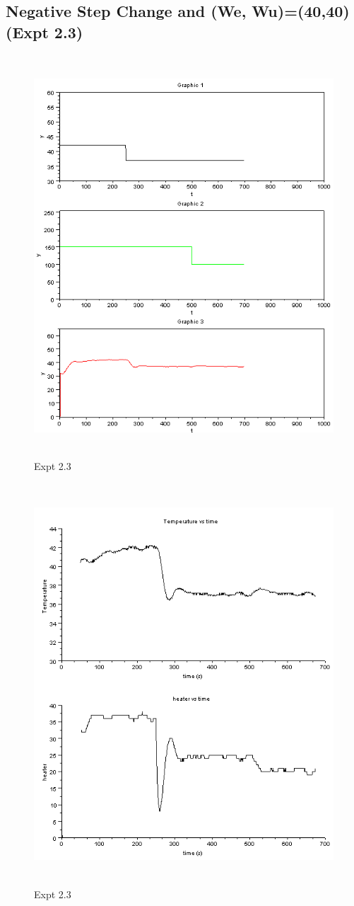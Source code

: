 \subsection{Negative Step Change and (We, Wu)=(40,40) (Expt 2.3)}
\begin{figure}[H]
 \includegraphics[width=12cm, height=15cm]{mpc/2_3.PNG}
  \caption{Expt 2.3}
\end{figure}
\begin{figure}[H]
  \includegraphics[width=12cm, height=15cm]{mpc/2_3_heater_final.png}
  \caption{ Expt 2.3}
\end{figure}


